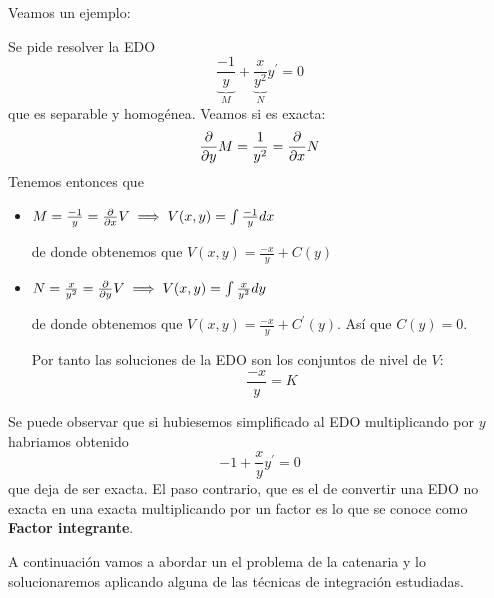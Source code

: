 \documentclass{mathnotes}
\begin{document}
Veamos un ejemplo:

\begin{example}
Se pide resolver la EDO $$\underbrace{\frac{-1}{y}}_M+\underbrace{\frac{x}{y^2}}_Ny^\prime = 0$$ que es separable y homogénea.
Veamos si es exacta: $$\frac{\partial}{\partial y}M = \frac{1}{y^2} = \frac{\partial}{\partial x}N$$
Tenemos entonces que 
\begin{itemize}
\item $M = \frac{-1}{y} = \frac{\partial}{\partial x}V \implies V(x,y) = \int \frac{-1}{y}dx$

de donde obtenemos que $V(x,y) = \frac{-x}{y} + C(y)$

\item $N = \frac{x}{y^2} = \frac{\partial}{\partial y}V \implies V(x,y) = \int \frac{x}{y^2}dy$

de donde obtenemos que $V(x,y) = \frac{-x}{y} + C^\prime(y)$. Así que $C(y) = 0$.

Por tanto las soluciones de la EDO son los conjuntos de nivel de $V$: $$\frac{-x}{y} = K$$
\end{itemize}

Se puede observar que si hubiesemos simplificado al EDO multiplicando por $y$ habriamos obtenido $$-1+\frac{x}{y}y^\prime = 0$$ que deja de ser exacta. El paso contrario, que es el de convertir una EDO no exacta en una exacta multiplicando por un factor es lo que se conoce como \textbf{Factor integrante}.
\end{example}

A continuación vamos a abordar un el problema de la catenaria y lo solucionaremos aplicando alguna de las técnicas de integración estudiadas.
\end{document}

